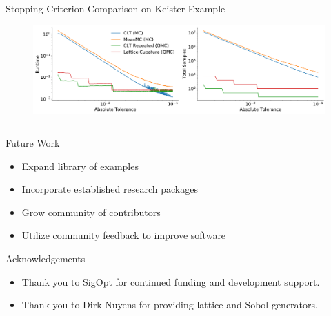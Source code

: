 \documentclass[final]{beamer}
\newcommand{\bfCenter}[1]{\centerline{\textbf{#1}}}
\newlength{\onecolwid}
\newlength{\twocolwid}
\begin{document}
\begin{frame}[t]
\begin{columns}[t]
\begin{column}{\twocolwid}
\begin{block}{Stopping Criterion Comparison on Keister Example}
    \begin{figure}
        \includegraphics[width=1\textwidth]{Images/vary_abs_tol.png}
    \end{figure}
\end{block}


\begin{columns}[t,totalwidth=\twocolwid]  

\begin{column}{\onecolwid}\vspace{-1in}
\begin{block}{Future Work}
    \begin{itemize}
        \item Expand library of examples
        \item Incorporate established research packages
        \item Grow community of contributors
        \item Utilize community feedback to improve software
    \end{itemize}
\end{block}

\begin{block}{Acknowledgements}
    \begin{itemize}
        \item Thank you to SigOpt for continued funding and development support.
        \item Thank you to Dirk Nuyens for providing lattice and Sobol generators. 
    \end{itemize}
\end{block}


\end{column}
\end{columns}
\end{column}
\end{columns}
\end{frame}
\end{document}
